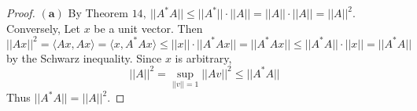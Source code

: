 \documentclass[11pt]{article}
\theoremstyle{quest}
\begin{document}
\begin{proof}
$\mathbf{(a)}$ By Theorem $14,\ ||A^*A|| \le ||A^*|| \cdot ||A|| = ||A|| \cdot ||A|| = ||A||^2$.
Conversely, Let $x$ be a unit vector. Then 
$$||Ax||^2 = \langle Ax, Ax \rangle = \langle x, A^*Ax \rangle \le ||x|| \cdot ||A^*Ax|| = ||A^*Ax|| \le ||A^*A|| \cdot ||x|| = ||A^*A||$$
by the Schwarz inequality. Since $x$ is arbitrary,
$$||A||^2 = \sup_{||v||=1} ||Av||^2 \le ||A^*A||$$
Thus $||A^*A|| = ||A||^2$.
\end{proof}
\end{document}
